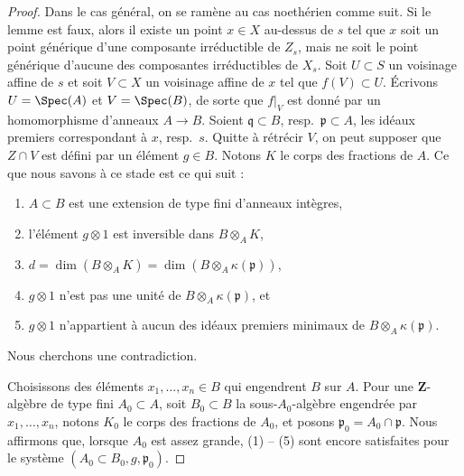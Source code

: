 \begin{proof}
\medskip\noindent
Dans le cas général, on se ramène au cas noethérien comme suit.
Si le lemme est faux, alors il existe un point
$x \in X$ au-dessus de $s$ tel que $x$ soit un point générique d'une
composante irréductible de $Z_s$, mais
ne soit le point générique d'aucune des composantes irréductibles de $X_s$.
Soit $U \subset S$ un voisinage affine de $s$ et soit
$V \subset X$ un voisinage affine de $x$ tel que $f(V) \subset U$.
Écrivons $U = \Spec(A)$ et $V = \Spec(B)$, de sorte que $f|_V$
est donné par un homomorphisme d'anneaux $A \to B$. Soient $\mathfrak q \subset B$,
resp.\ $\mathfrak p \subset A$, les idéaux premiers correspondant à $x$, resp.\ $s$.
Quitte à rétrécir $V$, on peut supposer que $Z \cap V$ est défini par
un élément $g \in B$. Notons $K$ le corps des fractions de $A$.
Ce que nous savons à ce stade est ce qui suit :
\begin{enumerate}
\item $A \subset B$ est une extension de type fini d'anneaux intègres,
\item l'élément $g \otimes 1$ est inversible dans $B \otimes_A K$,
\item $d = \dim(B \otimes_A K) = \dim(B \otimes_A \kappa(\mathfrak p))$,
\item $g \otimes 1$ n'est pas une unité de $B \otimes_A \kappa(\mathfrak p)$, et
\item $g \otimes 1$ n'appartient à aucun des idéaux premiers minimaux de
$B \otimes_A \kappa(\mathfrak p)$.
\end{enumerate}
Nous cherchons une contradiction.

\medskip\noindent
Choisissons des éléments $x_1, \ldots, x_n \in B$ qui engendrent $B$ sur $A$.
Pour une $\mathbf{Z}$-algèbre de type fini $A_0 \subset A$,
soit $B_0 \subset B$ la sous-$A_0$-algèbre engendrée par
$x_1, \ldots, x_n$, notons $K_0$ le corps des fractions de $A_0$, et posons
$\mathfrak p_0 = A_0 \cap \mathfrak p$.
Nous affirmons que, lorsque $A_0$ est assez grande, (1) -- (5) sont encore satisfaites pour
le système $(A_0 \subset B_0, g, \mathfrak p_0)$.


\end{proof}
